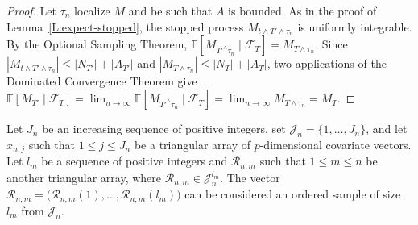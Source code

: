 \documentclass[aoas,preprint]{imsart}
\begin{document}
\begin{proof}
    Let $\tau_n$ localize $M$ and be such that $A$ is bounded.
    As in the proof of Lemma~\ref{L:expect-stopped}, the stopped process
    $M_{t \wedge T' \wedge \tau_n}$ is uniformly integrable.
    By the Optional Sampling Theorem,
    \(
        \mathbb{E} [ M_{T'^\wedge \tau_n} \mid \mathcal{F}_T ]
            = M_{T \wedge \tau_n}.
    \)
    Since
    \(
        |M_{t \wedge T' \wedge \tau_n}|
        \leq
        |N_{T'}|
        +
        |A_{T'}|
    \)
    and $| M_{T \wedge \tau_n}| \leq |N_T| + |A_T|$,
    two applications of the Dominated Convergence Theorem give
    \(
        \mathbb{E} [ M_{T'} \mid \mathcal{F}_T ]
        =
        \lim_{n \to \infty}
        \mathbb{E} [ M_{T'^\wedge \tau_n} \mid \mathcal{F}_T ]
        =
        \lim_{n \to \infty}
        M_{T \wedge \tau_n}
        =
        M_T.
    \)
\end{proof}

\clearpage



Let $J_n$ be an increasing sequence of positive integers, set
$\mathcal{J}_n = \{ 1, \ldots, J_n \}$, and
let $x_{n,j}$ such that $1 \leq j \leq J_n$ be a triangular array of
$p$-dimensional covariate vectors.  Let $l_m$ be a sequence of positive
integers and $\mathcal{R}_{n,m}$ such that
$1 \leq m \leq n$ be another triangular array, where
$\mathcal{R}_{n,m} \in \mathcal{J}_n^{l_m}$.  The vector
\(
    \mathcal{R}_{n,m}
    =
    \big(
        \mathcal{R}_{n,m}(1), \ldots, \mathcal{R}_{n,m}(l_m)
    \big)
\)
can be considered an ordered sample of size $l_m$ from $\mathcal{J}_n$.
\end{document}
